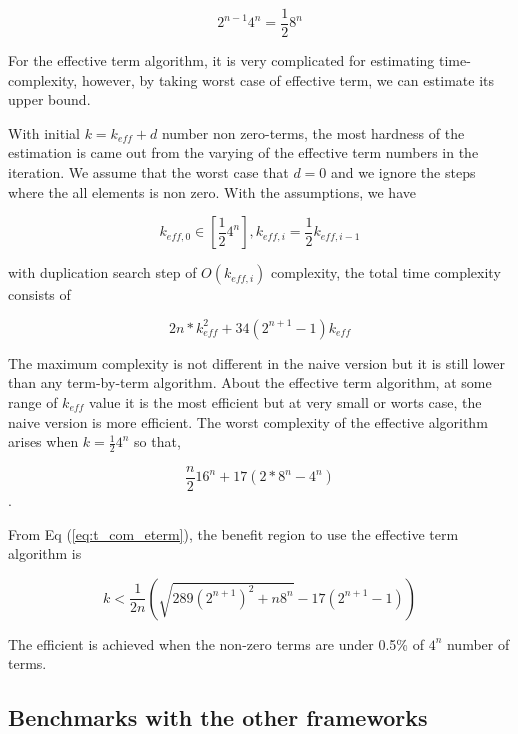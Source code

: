 \documentclass[twocolumn]{article}
\begin{document}
\begin{equation}
    2^{n-1} 4^n = \frac{1}{2}8^n
\end{equation}

For the effective term algorithm,
it is very complicated for estimating time-complexity,
however, by taking worst case of effective term, we can estimate its upper bound.

With initial $k = k_{eff} +d$ number non zero-terms,
the most hardness of the estimation is came out from the varying 
of the effective term numbers in the iteration.
We assume that the worst case that $d=0$ and we ignore the 
steps where the all elements is non zero.
With the assumptions, we have 

\begin{equation}
    k_{eff, 0} \in [\frac{1}{2}4^{n}], k_{eff, i} = \frac{1}{2} k_{eff, i-1}
\end{equation}

with duplication search step of $O(k_{eff, i})$ complexity,
the total time complexity consists of 

\begin{equation}
    \label{eq:t_com_eterm}
    2 n * k_{eff}^2 + 34 (2^{n+1} -1) k_{eff}
\end{equation} 

The maximum complexity is not different in the naive version but it is still
lower than any term-by-term algorithm. About the effective term algorithm,
at some range of $k_{eff}$ value it is the most efficient but 
at very small or worts case, the naive version is more efficient. 
The worst complexity of the effective algorithm arises 
when $k=\frac{1}{2}4^n$ so that,

\begin{equation}
    \frac{n}{2} 16^n + 17 (2 * 8^n - 4^n) 
\end{equation}.

From Eq (\ref{eq:t_com_eterm}), the benefit region to use 
the effective term algorithm is 

\begin{equation}
    k < \frac{1}{2n} \left(\sqrt{289(2^{n+1})^2 + n 8^n} - 17 (2^{n+1} -1) \right) 
\end{equation}

The efficient is achieved when the non-zero terms are under 0.5\% of $4^n$ number of terms.

\subsection{Benchmarks with the other frameworks}
\end{document}
